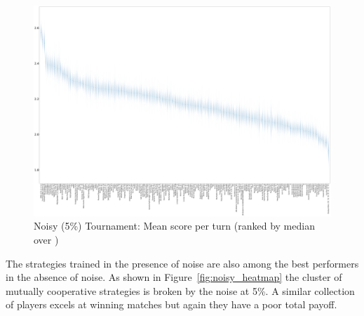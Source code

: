 \documentclass{article}
\begin{document}
\begin{landscape}
    \begin{figure}[!hbtp]
        \centering
        \includegraphics[width=\paperwidth]{./assets/noisy_scores_boxplots.pdf}
        \caption{Noisy (5\%) Tournament: Mean score per turn (ranked by median
        over
        \protecttournaments)}
        \label{fig:noisy_score}
    \end{figure}
\end{landscape}


The strategies trained in the presence of noise are also among the best
performers in the absence of noise. As shown in Figure~\ref{fig:noisy_heatmap}
the cluster of mutually cooperative strategies is broken by the noise at 5\%. A
similar collection of players excels at winning matches but again they have a
poor total payoff.
\end{document}
